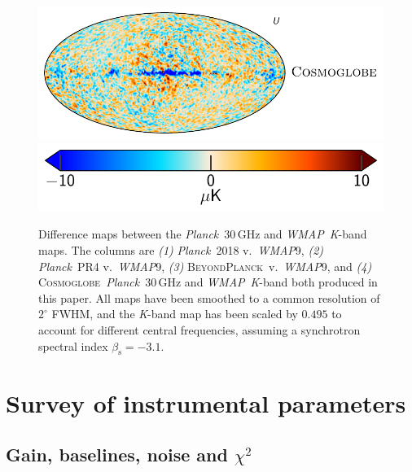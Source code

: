 \documentclass[twocolumn]{../../common/aa}
\def\WMAP{\emph{WMAP}}
\def\Planck{\emph{Planck}}
\newcommand{\BP}{\textsc{BeyondPlanck}}
\newcommand{\cosmoglobe}{\textsc{Cosmoglobe}}
\newcommand{\K}[0]{\textit K}
\begin{document}
\begin{figure}
	\includegraphics[height=0.15\textheight]{figures/diff_CG_U.pdf}\\
        \hspace*{40mm}\includegraphics[width=0.25\textheight]{figures/cbar_10uK.pdf}
	\caption{Difference maps between the \Planck\ 30\,GHz and \WMAP\ \K-band maps. The columns are \textit{(1)} \Planck\ 2018 v.~\WMAP9, \textit{(2)} \Planck\ PR4 v.~\WMAP9, \textit{(3)} \BP\ v.~\WMAP9, and \textit{(4)} \cosmoglobe\ \Planck\ 30\,GHz and \WMAP\ \K-band both produced in this paper. All maps have been smoothed to a common resolution of $2^\circ$ FWHM, and the \K-band map has been scaled by $0.495$ to account for different central frequencies, assuming a synchrotron spectral index $\beta_\mathrm s=-3.1$.}
\end{figure}









%






\appendix

\section{Survey of instrumental parameters}
\label{sec:survey}

\subsection{Gain, baselines, noise and $\chi^2$}
\end{document}
